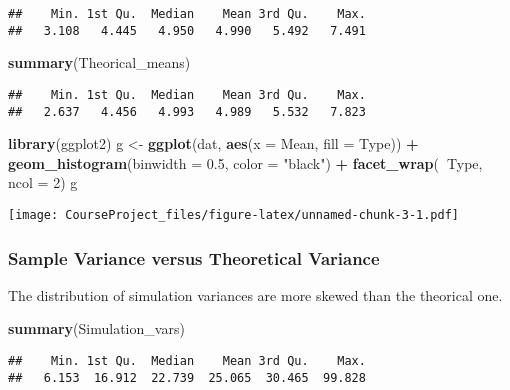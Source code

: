 \documentclass[]{article}
\newenvironment{Shaded}{\begin{snugshade}}{\end{snugshade}}
\newcommand{\KeywordTok}[1]{\textcolor[rgb]{0.13,0.29,0.53}{\textbf{#1}}}
\newcommand{\DataTypeTok}[1]{\textcolor[rgb]{0.13,0.29,0.53}{#1}}
\newcommand{\DecValTok}[1]{\textcolor[rgb]{0.00,0.00,0.81}{#1}}
\newcommand{\FloatTok}[1]{\textcolor[rgb]{0.00,0.00,0.81}{#1}}
\newcommand{\StringTok}[1]{\textcolor[rgb]{0.31,0.60,0.02}{#1}}
\newcommand{\OperatorTok}[1]{\textcolor[rgb]{0.81,0.36,0.00}{\textbf{#1}}}
\newcommand{\NormalTok}[1]{#1}
\begin{document}
\begin{verbatim}
##    Min. 1st Qu.  Median    Mean 3rd Qu.    Max. 
##   3.108   4.445   4.950   4.990   5.492   7.491
\end{verbatim}

\begin{Shaded}
\begin{Highlighting}[]
\KeywordTok{summary}\NormalTok{(Theorical_means)}
\end{Highlighting}
\end{Shaded}

\begin{verbatim}
##    Min. 1st Qu.  Median    Mean 3rd Qu.    Max. 
##   2.637   4.456   4.993   4.989   5.532   7.823
\end{verbatim}

\begin{Shaded}
\begin{Highlighting}[]
\KeywordTok{library}\NormalTok{(ggplot2)}
\NormalTok{g <-}\StringTok{ }\KeywordTok{ggplot}\NormalTok{(dat, }\KeywordTok{aes}\NormalTok{(}\DataTypeTok{x =}\NormalTok{ Mean, }\DataTypeTok{fill =}\NormalTok{ Type)) }\OperatorTok{+}
\StringTok{  }\KeywordTok{geom_histogram}\NormalTok{(}\DataTypeTok{binwidth =} \FloatTok{0.5}\NormalTok{, }\DataTypeTok{color =} \StringTok{"black"}\NormalTok{) }\OperatorTok{+}
\StringTok{  }\KeywordTok{facet_wrap}\NormalTok{(}\OperatorTok{~}\NormalTok{Type, }\DataTypeTok{ncol =} \DecValTok{2}\NormalTok{)}
\NormalTok{g}
\end{Highlighting}
\end{Shaded}

\texttt{[image: CourseProject\_files/figure-latex/unnamed-chunk-3-1.pdf]}

\subsubsection{Sample Variance versus Theoretical
Variance}\label{sample-variance-versus-theoretical-variance}

The distribution of simulation variances are more skewed than the
theorical one.

\begin{Shaded}
\begin{Highlighting}[]
\KeywordTok{summary}\NormalTok{(Simulation_vars)}
\end{Highlighting}
\end{Shaded}

\begin{verbatim}
##    Min. 1st Qu.  Median    Mean 3rd Qu.    Max. 
##   6.153  16.912  22.739  25.065  30.465  99.828
\end{verbatim}
\end{document}
